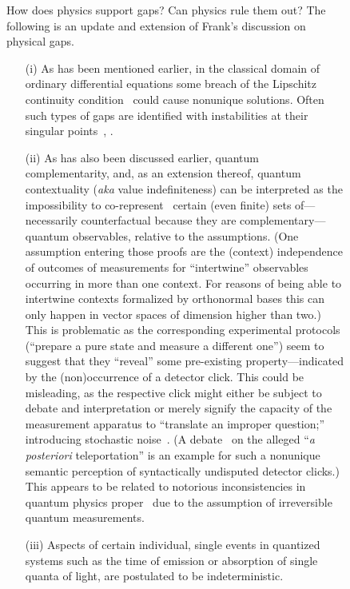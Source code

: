\documentclass[entropy,article,accept,oneauthor,pdftex]{Definitions/mdpi}
\begin{document}
\begin{figure}[H]
How does physics support gaps? Can physics rule them out?
The following is an update and extension of Frank's discussion on physical gaps.
\begin{itemize}

\item[(i)]
As has been mentioned earlier, in the classical domain of ordinary differential equations some breach of the
Lipschitz continuity condition~\cite[Chapter~17]{svozil-pac}
could cause nonunique solutions.
Often such types of gaps are identified with instabilities
at their singular points~\cite[pp.~211,212]{Campbell-1882}, \cite[Sect.~III,~13]{frank,franke}.

\item[(ii)]
As has also been discussed earlier, quantum complementarity, and, as an extension thereof, quantum contextuality ({\it aka} value indefiniteness) can
be interpreted as the impossibility to co-represent~\cite{peres,kochen1,2015-AnalyticKS}
certain (even finite) sets of---necessarily counterfactual because they are complementary---quantum observables,
relative to the assumptions.
(One assumption entering those proofs are the (context) independence
of outcomes of measurements for ``intertwine'' observables occurring in more than one context.
For reasons of being able to intertwine contexts formalized by orthonormal bases
this can only happen in vector spaces of dimension higher than two.)
This is problematic as the corresponding experimental protocols
(``prepare a pure state and measure a different one'') seem to suggest that they
``reveal'' some pre-existing property---indicated by the (non)occurrence of a detector click.
This could be misleading, as the respective click might
either be subject to debate and interpretation
or merely signify the capacity of the measurement apparatus
to ``translate an improper question;'' introducing stochastic noise~\cite{svozil-2003-garda}.
(A debate~\cite{Kimble-aposterioriQT,Bouwm-aposterioriQTReply}
on the alleged ``{\it a posteriori} teleportation'' is an example for such a nonunique
semantic perception of syntactically undisputed detector clicks.)
This appears to be related to notorious inconsistencies
in quantum physics proper~\cite{v-neumann-49,v-neumann-55,everett,wigner:mb,everett-collw} due to the
assumption of irreversible quantum measurements.

\item[(iii)]
Aspects of certain individual, single events in quantized systems such
as the time of emission or absorption of single quanta of light,
are postulated to be indeterministic.
\end{itemize}








\end{figure}
\end{document}
